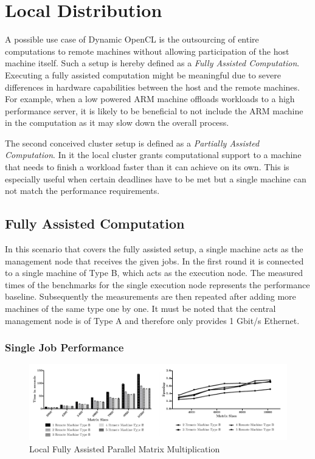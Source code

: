 \section{Local Distribution}
\label{local_distribution}
A possible use case of Dynamic OpenCL is the outsourcing of entire computations to remote machines without allowing participation of the host machine itself. Such a setup is hereby defined as a \textit{Fully Assisted Computation}. Executing a fully assisted computation might be meaningful due to severe differences in hardware capabilities between the host and the remote machines. For example, when a low powered ARM machine offloads workloads to a high performance server, it is likely to be beneficial to not include the ARM machine in the computation as it may slow down the overall process.

The second conceived cluster setup is defined as a \textit{Partially Assisted Computation}. In it the local cluster grants computational support to a machine that needs to finish a workload faster than it can achieve on its own. This is especially useful when certain deadlines have to be met but a single machine can not match the performance requirements.
\subsection{Fully Assisted Computation}
In this scenario that covers the fully assisted setup, a single machine acts as the management node that receives the given jobs. In the first round it is connected to a single machine of Type B, which acts as the execution node. The measured times of the benchmarks for the single execution node represents the performance baseline. Subsequently the measurements are then repeated after adding more machines of the same type one by one. It must be noted that the central management node is of Type A and therefore only provides 1 Gbit/s Ethernet.

\subsubsection*{Single Job Performance}

\begin{figure}[!htb]

	\includegraphics[width=1.0\textwidth]{images/local_fully_assisted_matrix.pdf}
	\centering
	\caption{Local Fully Assisted Parallel Matrix Multiplication}
	\label{img:fully_assisted_parallel_matrix}
\end{figure}


